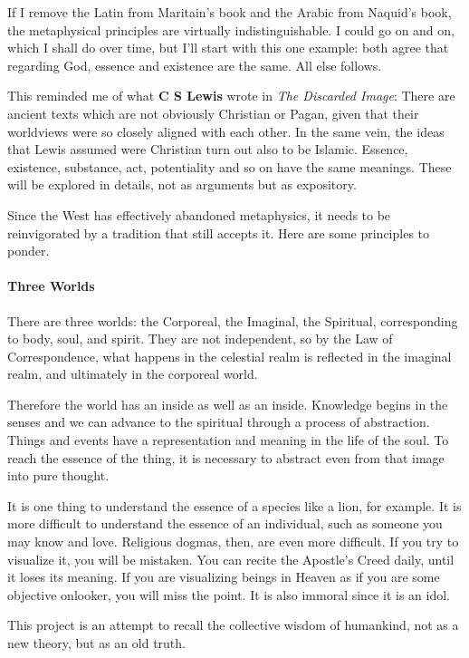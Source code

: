 \begin{quotex}
If I remove the Latin from Maritain's book and the Arabic from Naquid's book, the metaphysical principles are virtually indistinguishable. I could go on and on, which I shall do over time, but I'll start with this one example: both agree that regarding God, essence and existence are the same. All else follows.

\end{quotex}
This reminded me of what \textbf{C S Lewis} wrote in \emph{The Discarded Image}: There are ancient texts which are not obviously Christian or Pagan, given that their worldviews were so closely aligned with each other. In the same vein, the ideas that Lewis assumed were Christian turn out also to be Islamic. Essence, existence, substance, act, potentiality and so on have the same meanings. These will be explored in details, not as arguments but as expository.

Since the West has effectively abandoned metaphysics, it needs to be reinvigorated by a tradition that still accepts it. Here are some principles to ponder.

\paragraph{Three Worlds}
There are three worlds: the Corporeal, the Imaginal, the Spiritual, corresponding to body, soul, and spirit. They are not independent, so by the Law of Correspondence, what happens in the celestial realm is reflected in the imaginal realm, and ultimately in the corporeal world.

Therefore the world has an inside as well as an inside. Knowledge begins in the senses and we can advance to the spiritual through a process of abstraction. Things and events have a representation and meaning in the life of the soul. To reach the essence of the thing, it is necessary to abstract even from that image into pure thought.

It is one thing to understand the essence of a species like a lion, for example. It is more difficult to understand the essence of an individual, such as someone you may know and love. Religious dogmas, then, are even more difficult. If you try to visualize it, you will be mistaken. You can recite the Apostle's Creed daily, until it loses its meaning. If you are visualizing beings in Heaven as if you are some objective onlooker, you will miss the point. It is also immoral since it is an idol.

This project is an attempt to recall the collective wisdom of humankind, not as a new theory, but as an old truth.


